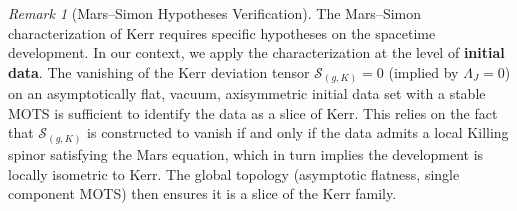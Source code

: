 \documentclass[12pt]{article}
\theoremstyle{plain}
\theoremstyle{definition}
\theoremstyle{remark}
\newtheorem{remark}[theorem]{Remark}
\begin{document}
\begin{remark}[Mars--Simon Hypotheses Verification]\label{rem:mars-simon-hypotheses}
The Mars--Simon characterization of Kerr requires specific hypotheses on the spacetime development. In our context, we apply the characterization at the level of \textbf{initial data}. The vanishing of the Kerr deviation tensor $\mathcal{S}_{(g,K)} = 0$ (implied by $\Lambda_J = 0$) on an asymptotically flat, vacuum, axisymmetric initial data set with a stable MOTS is sufficient to identify the data as a slice of Kerr. This relies on the fact that $\mathcal{S}_{(g,K)}$ is constructed to vanish if and only if the data admits a local Killing spinor satisfying the Mars equation, which in turn implies the development is locally isometric to Kerr. The global topology (asymptotic flatness, single component MOTS) then ensures it is a slice of the Kerr family.
\end{remark}
\end{document}
